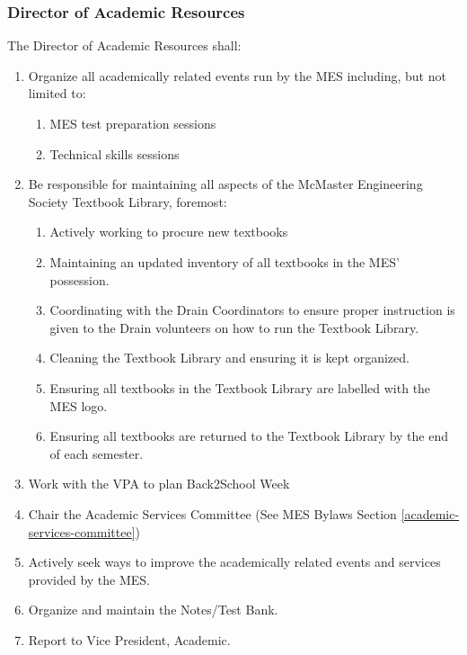 \subsubsection{Director of Academic Resources}
\label{director-of-academic-resources}
The Director of Academic Resources shall:

\begin{enumerate}
 \item
  Organize all academically related events run by the MES including, but not limited to:

  \begin{enumerate}
   \item
    MES test preparation sessions
   \item
    Technical skills sessions
  \end{enumerate}
 \item
  Be responsible for maintaining all aspects of the McMaster Engineering Society Textbook Library, foremost:

  \begin{enumerate}
   \item
    Actively working to procure new textbooks
   \item
    Maintaining an updated inventory of all textbooks in the MES' possession.
   \item
    Coordinating with the Drain Coordinators to ensure proper instruction is given to the Drain volunteers on how to run the Textbook Library.
   \item
    Cleaning the Textbook Library and ensuring it is kept organized.
   \item
    Ensuring all textbooks in the Textbook Library are labelled with the MES logo.
   \item
    Ensuring all textbooks are returned to the Textbook Library by the end of each semester.
  \end{enumerate}
 \item
  Work with the VPA to plan Back2School Week
 \item
  Chair the Academic Services Committee (See MES Bylaws Section \ref{academic-services-committee})
 \item
  Actively seek ways to improve the academically related events and services provided by the MES.
 \item
  Organize and maintain the Notes/Test Bank.
 \item
  Report to Vice President, Academic.
\end{enumerate}
